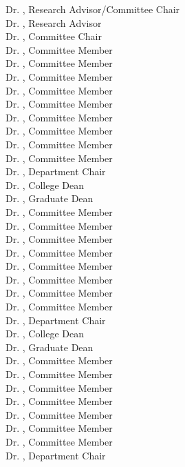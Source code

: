 \begin{titlepage}
\ifdefined\reschair
\noindent
Dr. \reschair, Research Advisor/Committee Chair\\
\else
\noindent
Dr. \resadv, Research Advisor \\
Dr. \comchair, Committee Chair\\
\fi
\ifdefined\commemi
\noindent
Dr. \commema, Committee Member\\
Dr. \commemb, Committee Member\\
Dr. \commemc, Committee Member\\
Dr. \commemd, Committee Member\\
Dr. \commeme, Committee Member\\
Dr. \commemf, Committee Member\\
Dr. \commemg, Committee Member\\
Dr. \commemh, Committee Member\\
Dr. \commemi, Committee Member\\
Dr. \depchair, Department Chair\\
Dr. \colldean, College Dean\\
Dr. \graddean, Graduate Dean\\
\else
\ifdefined\commemh
\noindent
Dr. \commema, Committee Member\\
Dr. \commemb, Committee Member\\
Dr. \commemc, Committee Member\\
Dr. \commemd, Committee Member\\
Dr. \commeme, Committee Member\\
Dr. \commemf, Committee Member\\
Dr. \commemg, Committee Member\\
Dr. \commemh, Committee Member\\
Dr. \depchair, Department Chair\\
Dr. \colldean, College Dean\\
Dr. \graddean, Graduate Dean\\
\else
\ifdefined\commemg
\noindent
Dr. \commema, Committee Member\\
Dr. \commemb, Committee Member\\
Dr. \commemc, Committee Member\\
Dr. \commemd, Committee Member\\
Dr. \commeme, Committee Member\\
Dr. \commemf, Committee Member\\
Dr. \commemg, Committee Member\\
Dr. \depchair, Department Chair\\

\end{titlepage}
